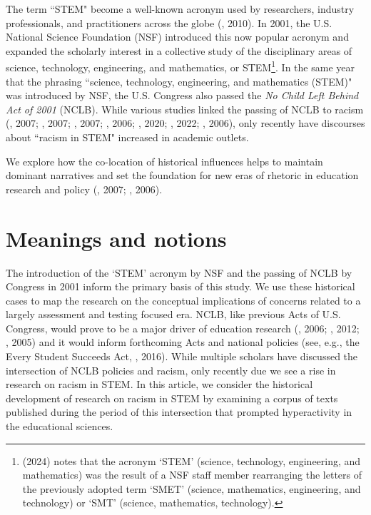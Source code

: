 

\newpage

The term ``STEM" become a well-known acronym used by researchers, industry professionals, and practitioners across the globe (\cite{dugger2010evolution}, 2010). In 2001, the U.S. National Science Foundation (NSF) introduced this now popular acronym and expanded the scholarly interest in a collective study of the disciplinary areas of science, technology, engineering, and mathematics, or  STEM\footnote{\cite{hallinen2024} (2024) notes that the acronym `STEM' (science, technology, engineering, and mathematics) was the result of a NSF staff member rearranging the letters of the previously adopted term `SMET' (science, mathematics, engineering, and technology) or `SMT' (science, mathematics, technology).}. In the same year that the phrasing ``science, technology, engineering, and mathematics (STEM)" was introduced by NSF, the U.S. Congress also passed the \textit{No Child Left Behind Act of 2001} (NCLB). While various studies linked the passing of NCLB to racism (\cite{gay2007rhetoric}, 2007; \cite{lapayese2007understanding}, 2007; \cite{leonardo2007war}, 2007; \cite{taylor2006critical}, 2006; \cite{au2020testing}, 2020; \cite{wun2022anti}, 2022; \cite{taylor2006critical}, 2006), only recently have discourses about ``racism in STEM" increased in academic outlets. 

We explore how the co-location of historical influences helps to maintain dominant narratives and set the foundation for new eras of rhetoric in education research and policy (\cite{gay2007rhetoric}, 2007; \cite{standerfer2006before}, 2006).

\section{Meanings and notions}
\label{sec:meanings}

The introduction of the `STEM' acronym by NSF and the passing of NCLB by Congress in 2001 inform the primary basis of this study. We use these historical cases to map the research on the conceptual implications of concerns related to a largely assessment and testing focused era. NCLB, like previous Acts of U.S. Congress, would prove to be a major driver of education research (\cite{cawelti2006side}, 2006; \cite{groen2012nclb}, 2012; \cite{sunderman2005nclb}, 2005) and it would inform forthcoming Acts and national policies (see, e.g., the Every Student Succeeds Act, \cite{mathis2016lessons}, 2016). While multiple scholars have discussed the intersection of NCLB policies and racism, only recently due we see a rise in research on racism in STEM. In this article, we consider the historical development of research on racism in STEM by examining a corpus of texts published during the period of this intersection that prompted hyperactivity in the educational sciences.

